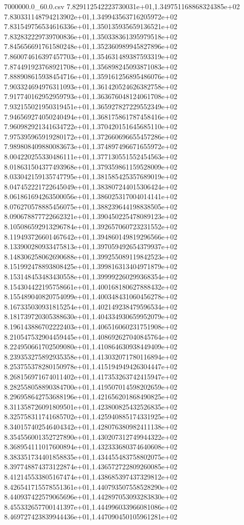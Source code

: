 \begin{filecontents*}{7000000.0_60.0.csv}
7.829112542223730031e+01,1.349751168868324385e+02
7.830331148794213902e+01,1.349943563716205972e+02
7.831549756534616336e+01,1.350135935659136521e+02
7.832832229739700836e+01,1.350338361395979518e+02
7.845656691761580248e+01,1.352360989945827896e+02
7.860074616397457703e+01,1.354631489387593319e+02
7.874491923768921708e+01,1.356898245093871083e+02
7.888908615938454716e+01,1.359161256895486076e+02
7.903324694976311093e+01,1.361420524626382758e+02
7.917740162952959793e+01,1.363676048124061708e+02
7.932155021950319451e+01,1.365927827229552349e+02
7.946569274050240494e+01,1.368175861787458416e+02
7.960982921341634722e+01,1.370420151645685110e+02
7.975395965919280172e+01,1.372660696655457286e+02
7.989808409880083673e+01,1.374897496671655972e+02
8.004220255330486111e+01,1.377130551552454563e+02
8.018631504377493968e+01,1.379359861159528009e+02
8.033042159135747795e+01,1.381585425357689019e+02
8.047452221722645049e+01,1.383807244015306424e+02
8.061861694263500056e+01,1.386025317004014141e+02
8.076270578885456075e+01,1.388239644198838505e+02
8.090678877722662321e+01,1.390450225478089123e+02
8.105086592913296784e+01,1.392657060723231552e+02
8.119493726601467642e+01,1.394860149819296566e+02
8.133900280933475813e+01,1.397059492654379937e+02
8.148306258062690688e+01,1.399255089119842523e+02
8.151992478893808425e+01,1.399816313404971879e+02
8.153148453483430558e+01,1.399992260299368354e+02
8.154304422195758661e+01,1.400168180627888432e+02
8.155489040820754099e+01,1.400348431060456278e+02
8.167335030931815254e+01,1.402149238479596534e+02
8.181739720305388630e+01,1.404334930659952079e+02
8.196143886702222403e+01,1.406516060231751908e+02
8.210547532904459445e+01,1.408692627040845764e+02
8.224950661702509080e+01,1.410864630938449409e+02
8.239353275892935358e+01,1.413032071780116894e+02
8.253755378280150978e+01,1.415194949426304447e+02
8.268156971674011402e+01,1.417353263742415947e+02
8.282558058890384700e+01,1.419507014598202659e+02
8.296958642753688196e+01,1.421656201868490825e+02
8.311358726091809501e+01,1.423800825432526835e+02
8.325758311741685702e+01,1.425940885174331925e+02
8.340157402546404342e+01,1.428076380982411138e+02
8.354556001352727890e+01,1.430207312749944322e+02
8.368954111017600894e+01,1.432333680374640608e+02
8.383351734401858835e+01,1.434455483758802075e+02
8.397748874373122874e+01,1.436572722809260085e+02
8.412145533805167474e+01,1.438685397437329812e+02
8.426541715578551361e+01,1.440793507558528290e+02
8.440937422579065696e+01,1.442897053093283830e+02
8.455332657700141397e+01,1.444996033966081086e+02
8.469727423839944436e+01,1.447090450105961281e+02

\end{filecontents*}
